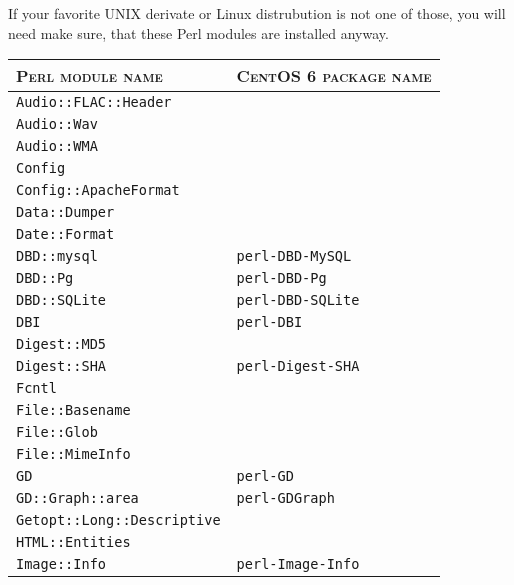 \begin{colframeimportantnote}
If your favorite UNIX derivate or Linux distrubution is not one of those, you will need make sure, that these Perl modules are installed anyway.
\end{colframeimportantnote}

\begin{table}
	\centering
	\begin{tabular}{|p{15em}|p{18em}|}
		\hline
		\textsc{Perl module name} 						&  \textsc{CentOS 6 package name}\\
		\hline
		\hline
		\verb|Audio::FLAC::Header| 						& \\
		\hline
		\verb|Audio::Wav| 										& \\
		\hline
		\verb|Audio::WMA| 										& \\
		\hline
		\verb|Config| 												& \\
		\hline
		\verb|Config::ApacheFormat|						& \\
		\hline
		\verb|Data::Dumper| 									& \\
		\hline
		\verb|Date::Format| 									&	\\
		\hline
		\verb|DBD::mysql|											& \verb|perl-DBD-MySQL| \\
		\hline
		\verb|DBD::Pg|												& \verb|perl-DBD-Pg| \\
		\hline
		\verb|DBD::SQLite|										& \verb|perl-DBD-SQLite| \\
		\hline
		\verb|DBI|														& \verb|perl-DBI| \\
		\hline
		\verb|Digest::MD5| 										& \\
		\hline
		\verb|Digest::SHA| 										& \verb|perl-Digest-SHA| \\
		\hline
		\verb|Fcntl| 													& \\
		\hline
		\verb|File::Basename| 								& \\
		\hline
		\verb|File::Glob| 										& \\
		\hline
		\verb|File::MimeInfo| 								& \\
		\hline
		\verb|GD| 														& \verb|perl-GD|\\
		\hline
		\verb|GD::Graph::area| 								& \verb|perl-GDGraph| \\
		\hline
		\verb|Getopt::Long::Descriptive| 			& \\
		\hline
		\verb|HTML::Entities|									& \\
		\hline
		\verb|Image::Info| 										& \verb|perl-Image-Info| \\

\end{tabular}
\end{table}
